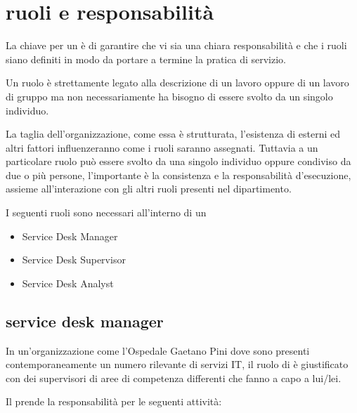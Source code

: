 %
%
\section[Ruoli e responsabilità]{ruoli e responsabilità}
\label{sd-roles-responsabilities}
La chiave per un   è di garantire che vi sia una chiara responsabilità e che i ruoli siano definiti in modo da portare a termine la pratica di servizio. 

Un ruolo è strettamente legato alla descrizione di un lavoro oppure di un lavoro di gruppo ma non necessariamente ha bisogno di essere svolto da un singolo individuo.

La taglia dell'organizzazione, come essa è strutturata, l'esistenza di  esterni ed altri fattori influenzeranno come i ruoli saranno assegnati. Tuttavia a un particolare ruolo può essere svolto da una singolo individuo oppure condiviso da due o più persone, l'importante è la consistenza e la responsabilità d'esecuzione, assieme all'interazione con gli altri ruoli presenti nel dipartimento.

I seguenti ruoli sono necessari all'interno di un 

\begin{itemize}
\item{Service Desk Manager}
\item{Service Desk Supervisor}
\item{Service Desk Analyst}
\end{itemize}

\subsection[Service Desk Manager]{service desk manager}
\label{sd-sd-manger}
In un'organizzazione come l'Ospedale Gaetano Pini dove sono presenti contemporaneamente un numero rilevante di servizi \acs{IT}, il ruolo di  è giustificato con dei supervisori di aree di competenza differenti che fanno a capo a lui/lei.

Il  prende la responsabilità per le seguenti attività:

